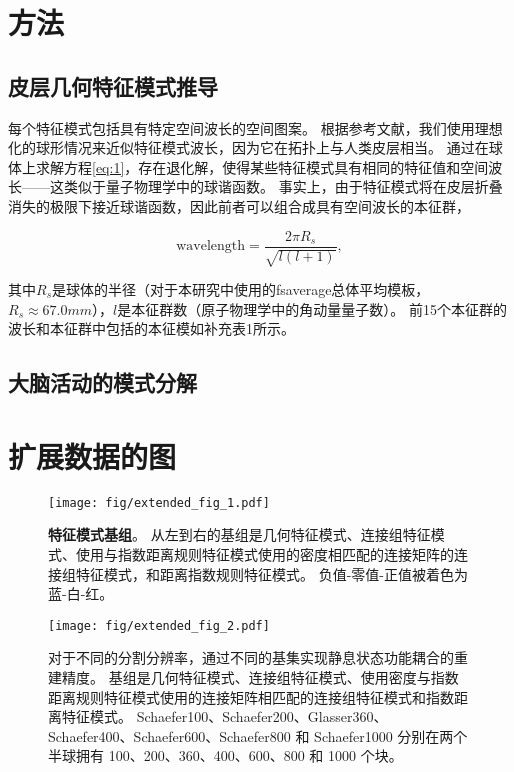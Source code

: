 \documentclass[lang=cn,a4paper,newtx]{elegantpaper}
\begin{document}
\section{方法} \label{sec:method}

\subsection{皮层几何特征模式推导} \label{sec:derivation}

每个特征模式包括具有特定空间波长的空间图案。
根据参考文献\cite{robinson2016eigenmodes}，我们使用理想化的球形情况来近似特征模式波长，因为它在拓扑上与人类皮层相当。
通过在球体上求解方程\ref{eq:1}，存在退化解，使得某些特征模式具有相同的特征值和空间波长——这类似于量子物理学中的球谐函数。
事实上，由于特征模式将在皮层折叠消失的极限下接近球谐函数，因此前者可以组合成具有空间波长的本征群，

\begin{equation}
	\text{wavelength} = \frac{2 \pi R_s}{\sqrt{l(l+1)}},
\end{equation}

其中$R_s$是球体的半径（对于本研究中使用的fsaverage总体平均模板，$R_s \approx 67.0 mm$），$l$是本征群数（原子物理学中的角动量量子数）。
前15个本征群的波长和本征群中包括的本征模如补充表1所示。


\subsection{大脑活动的模式分解} \label{sec:modal_decomposition}





\section{扩展数据的图}


\begin{figure}[!htb] 
	\centering
	\texttt{[image: fig/extended\_fig\_1.pdf]}
	\caption{\textbf{特征模式基组}。
		从左到右的基组是几何特征模式、连接组特征模式、使用与指数距离规则特征模式使用的密度相匹配的连接矩阵的连接组特征模式，和距离指数规则特征模式。 
		负值-零值-正值被着色为蓝-白-红。
	} \label{fig:extended_fig_1}
\end{figure}


\begin{figure}[!htb] 
	\centering
	\texttt{[image: fig/extended\_fig\_2.pdf]}
	\caption{对于不同的分割分辨率，通过不同的基集实现静息状态功能耦合的重建精度。 
		基组是几何特征模式、连接组特征模式、使用密度与指数距离规则特征模式使用的连接矩阵相匹配的连接组特征模式和指数距离特征模式。
		Schaefer100、Schaefer200、Glasser360、Schaefer400、Schaefer600、Schaefer800 和 Schaefer1000 分别在两个半球拥有 100、200、360、400、600、800 和 1000 个块。
	} \label{fig:extended_fig_2}
\end{figure}
\end{document}
